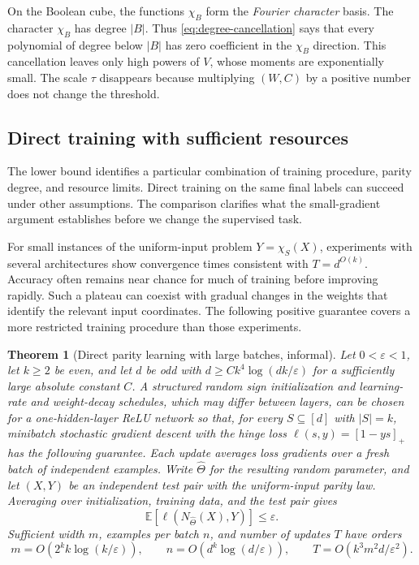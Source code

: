 \documentclass[11pt,twoside]{article}
\newcommand{\E}{\mathbb E}
\newtheorem{theorem}{Theorem}[section]
\theoremstyle{definition}
\theoremstyle{remark}
\begin{document}
On the Boolean cube, the functions $\chi_B$ form the \emph{Fourier character}
basis. The character $\chi_B$ has degree $|B|$. Thus
\cref{eq:degree-cancellation} says that every polynomial of degree below
$|B|$ has zero coefficient in the $\chi_B$ direction. This cancellation
leaves only high powers of $V$, whose moments are exponentially small.
The scale $\tau$ disappears because multiplying $(W,C)$ by a positive number
does not change the threshold.
\label{en:general-activations}

\subsection{Direct training with sufficient resources}
\label{sec:direct-learning}

The lower bound identifies a particular combination of training procedure,
parity degree, and resource limits. Direct training on the same final labels
can succeed under other assumptions. The comparison clarifies what the
small-gradient argument establishes before we change the supervised task.

For small instances of the uniform-input problem $Y=\chi_S(X)$, experiments
with several architectures show convergence times consistent with
$T=d^{O(k)}$. Accuracy often remains near chance for much of training before
improving rapidly. Such a plateau can coexist with gradual changes in the
weights that identify the relevant input coordinates. The following positive
guarantee covers a more restricted training procedure than those experiments.

\begin{theorem}[Direct parity learning with large batches, informal]
\label{thm:direct-parity-learning}
Let $0<\varepsilon<1$, let $k\ge2$ be even, and let $d$ be odd with
$d\ge Ck^4\log(dk/\varepsilon)$ for a sufficiently large absolute constant
$C$. A structured random sign initialization and learning-rate and
weight-decay schedules, which may differ between layers, can be chosen for a
one-hidden-layer ReLU network so that, for every $S\subseteq[d]$ with
$|S|=k$, minibatch stochastic gradient descent with the hinge loss
$\ell(s,y)=[1-ys]_+$ has the following guarantee. Each update averages loss
gradients over a fresh batch of independent examples.
Write $\widehat\Theta$ for the resulting random parameter, and let $(X,Y)$ be
an independent test pair with the uniform-input parity law. Averaging over
initialization, training data, and the test pair gives
\[
 \E[\ell(N_{\widehat\Theta}(X),Y)]\le\varepsilon.
\]
Sufficient width $m$, examples per batch $n$, and number
of updates $T$ have orders
\[
 m=O\!\left(2^k k\log(k/\varepsilon)\right),\qquad
 n=O\!\left(d^k\log(d/\varepsilon)\right),\qquad
 T=O(k^3m^2d/\varepsilon^2).
\]
\end{theorem}
\end{document}

